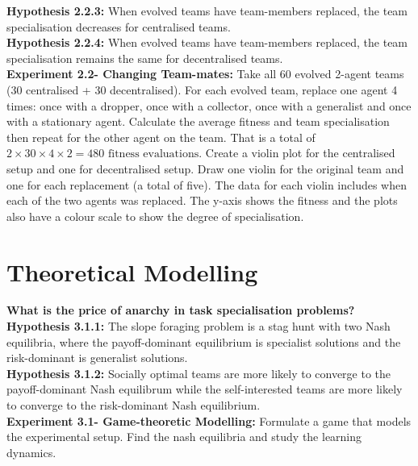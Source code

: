 \documentclass[12pt]{article}
\begin{document}
\textbf{Hypothesis 2.2.3:} When evolved teams have team-members replaced, the team specialisation decreases for centralised teams.\\

\textbf{Hypothesis 2.2.4:} When evolved teams have team-members replaced, the team specialisation remains the same for decentralised teams.\\

\textbf{Experiment 2.2- Changing Team-mates:} Take all 60 evolved 2-agent teams (30 centralised + 30 decentralised).
For each evolved team, replace one agent 4 times: once with a dropper, once with a collector, once with a generalist and once with a stationary agent.
Calculate the average fitness and team specialisation then repeat for the other agent on the team.
That is a total of $2 \times 30 \times 4 \times 2= 480 \mbox{ fitness evaluations}$. 
Create a violin plot for the centralised setup and one for decentralised setup.
Draw one violin for the original team and one for each replacement (a total of five).
The data for each violin includes when each of the two agents was replaced.
The y-axis shows the fitness and the plots also have a colour scale to show the degree of specialisation.\\

\section{Theoretical Modelling}

\textbf{What is the price of anarchy in task specialisation problems?}\\

\textbf{Hypothesis 3.1.1:} The slope foraging problem is a stag hunt with two Nash equilibria, where the payoff-dominant equilibrium is specialist solutions and the risk-dominant is generalist solutions.\\

\textbf{Hypothesis 3.1.2:} Socially optimal teams are more likely to converge to the payoff-dominant Nash equilibrum while the self-interested teams are more likely to converge to the risk-dominant Nash equilibrium.\\

\textbf{Experiment 3.1- Game-theoretic Modelling:} Formulate a game that models the experimental setup. 
Find the nash equilibria and study the learning dynamics.\\



\end{document}

